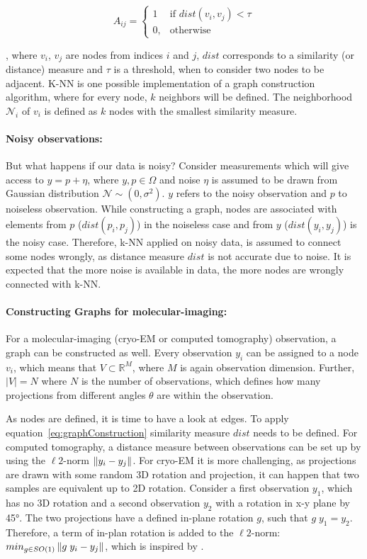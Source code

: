 \begin{equation}
    \label{eq:graphConstruction}
    A_{ij} =    
    \begin{cases}
        1  & \text{if } dist(v_i, v_j) < \tau\\
        0, & \text{otherwise}
    \end{cases}
\end{equation}

, where $v_i$, $v_j$ are nodes from indices $i$ and $j$, $dist$ corresponds to a similarity (or distance) measure and $\tau$ is a threshold, 
when to consider two nodes to be adjacent.
K-NN is one possible implementation of a graph construction algorithm, 
where for every node, $k$ neighbors will be defined.
The neighborhood $\mathcal{N}_i$ of $v_i$ is defined as $k$ nodes with the smallest similarity measure.

\paragraph{Noisy observations:}
But what happens if our data is noisy?
Consider measurements which will give access to $y = p + \eta$, where $y,p \in \Omega$ and noise $\eta$ is assumed to be drawn from Gaussian distribution $\mathcal{N} \sim (0,\sigma^2)$.
$y$ refers to the noisy observation and $p$ to noiseless observation.
While constructing a graph, nodes are associated with elements from $p$ ($dist(p_i, p_j)$) in the noiseless case and from $y$ ($dist(y_i, y_j)$) is the noisy case.
Therefore, k-NN applied on noisy data, is assumed to connect some nodes wrongly, as distance measure $dist$
is not accurate due to noise. It is expected that the more noise is available in data, the more nodes are wrongly connected with k-NN.

\paragraph{Constructing Graphs for molecular-imaging:}
For a molecular-imaging (cryo-EM or computed tomography) observation, a graph can be constructed as well.
Every observation $y_i$ can be assigned to a node $v_i$, which means that $V \subset \mathbb{R}^M$, where 
$M$ is again observation dimension. 
Further, $|V|=N$ where $N$ is the number of observations, which defines how many projections from different
angles $\theta$ are within the observation.

As nodes are defined, it is time to have a look at edges.
To apply equation~\ref{eq:graphConstruction} similarity measure $dist$ needs to be defined.
For computed tomography, a distance measure between observations can be set up by using the $\ell2$-norm $\left\lVert y_i - y_j\right\rVert$.
For cryo-EM it is more challenging, as projections are drawn with some random 3D rotation and projection, 
it can happen that two samples are equivalent up to 2D rotation. 
Consider a first observation $y_1$, which has no 3D rotation and 
a second observation $y_2$ with a rotation in x-y plane by 45°.
The two projections have a defined in-plane rotation $g$, such that $g \; y_1 = y_2$.
Therefore, a term of in-plan rotation is added to the $\ell2$-norm: $min_{g \in SO(1)}\left\lVert g \;y_i - y_j\right\rVert$, 
which is inspired by \cite{multiDiffusionMaps}. 


